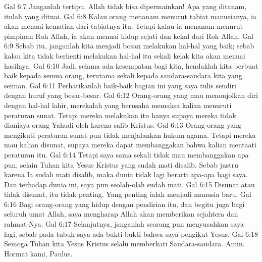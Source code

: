 Gal 6:7  Janganlah tertipu. Allah tidak bisa dipermainkan! Apa yang ditanam, itulah yang dituai.
Gal 6:8  Kalau orang menanam menurut tabiat manusianya, ia akan menuai kematian dari tabiatnya itu. Tetapi kalau ia menanam menurut pimpinan Roh Allah, ia akan menuai hidup sejati dan kekal dari Roh Allah.
Gal 6:9  Sebab itu, janganlah kita menjadi bosan melakukan hal-hal yang baik; sebab kalau kita tidak berhenti melakukan hal-hal itu sekali kelak kita akan menuai hasilnya.
Gal 6:10  Jadi, selama ada kesempatan bagi kita, hendaklah kita berbuat baik kepada semua orang, terutama sekali kepada saudara-saudara kita yang seiman.
Gal 6:11  Perhatikanlah baik-baik bagian ini yang saya tulis sendiri dengan huruf yang besar-besar.
Gal 6:12  Orang-orang yang mau menonjolkan diri dengan hal-hal lahir, merekalah yang berusaha memaksa kalian menuruti peraturan sunat. Tetapi mereka melakukan itu hanya supaya mereka tidak dianiaya orang Yahudi oleh karena salib Kristus.
Gal 6:13  Orang-orang yang mengikuti peraturan sunat pun tidak menjalankan hukum agama. Tetapi mereka mau kalian disunat, supaya mereka dapat membanggakan bahwa kalian mentaati peraturan itu.
Gal 6:14  Tetapi saya sama sekali tidak mau membanggakan apa pun, selain Tuhan kita Yesus Kristus yang sudah mati disalib. Sebab justru karena Ia sudah mati disalib, maka dunia tidak lagi berarti apa-apa bagi saya. Dan terhadap dunia ini, saya pun seolah-olah sudah mati.
Gal 6:15  Disunat atau tidak disunat, itu tidak penting. Yang penting ialah menjadi manusia baru.
Gal 6:16  Bagi orang-orang yang hidup dengan pendirian itu, dan begitu juga bagi seluruh umat Allah, saya mengharap Allah akan memberikan sejahtera dan rahmat-Nya.
Gal 6:17  Selanjutnya, janganlah seorang pun menyusahkan saya lagi, sebab pada tubuh saya ada bukti-bukti bahwa saya pengikut Yesus.
Gal 6:18  Semoga Tuhan kita Yesus Kristus selalu memberkati Saudara-saudara. Amin. Hormat kami, Paulus.


